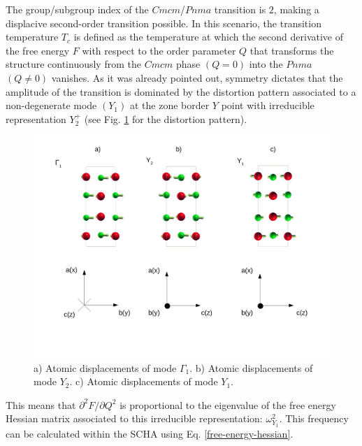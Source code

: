The group/subgroup index of the $Cmcm$/$Pnma$ transition is $2$, making a displacive second-order transition possible\cite{toledano1987landau}. In this scenario, the transition temperature $T_{c}$ is defined as the temperature 
at which the second derivative of the free energy $F$ with respect to the order parameter $Q$ that transforms the structure continuously from the $Cmcm$ phase $(Q=0)$ into the $Pnma$ $(Q\ne0)$ vanishes. As it was already 
pointed out\cite{chattopadhyay1986neutron}, symmetry\cite{orobengoa2009amplimodes,perez2010mode} dictates that the amplitude of the transition is dominated by the distortion pattern associated to a non-degenerate mode $(Y_{1})$
at the zone border $Y$ point with irreducible representation $Y_{2}^{+}$ (see Fig. \ref{patterns} for the distortion pattern).
\begin{figure}[h]
\begin{center}
\includegraphics[width=0.8\linewidth]{Figures/normal-modes.pdf}
\caption[Phonon eigenvector patterns.]{a) Atomic displacements of mode $\Gamma_{1}$. b) Atomic displacements of mode $Y_{2}$. c) Atomic displacements of mode $Y_{1}$.}
\label{patterns}
\end{center}
\end{figure}
This means that $\partial^{2}F/\partial Q^{2}$ is proportional to the eigenvalue of the free energy Hessian matrix associated to this irreducible representation: $\omega_{Y_{1}}^{2}$. This frequency can be calculated within the 
SCHA using Eq. \ref{free-energy-hessian}. \\


